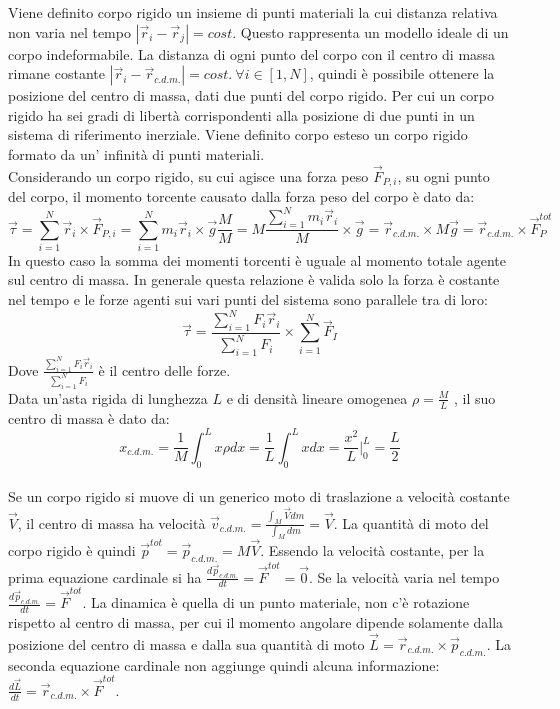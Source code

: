 \documentclass{article}
\numberwithin{equation}{subsection}
\begin{document}
Viene definito corpo rigido un insieme di punti materiali la 
cui distanza relativa non varia nel tempo $|\vec{r}_i-\vec{r}_j|=cost.$ Questo rappresenta un modello ideale di un corpo indeformabile. 
La distanza di ogni punto del corpo con il centro di massa 
rimane costante $|\vec{r}_i-\vec{r}_{c.d.m.}|=cost.\:\forall i\in[1,N]$, quindi è possibile ottenere la posizione 
del centro di massa, dati due punti del corpo rigido. Per cui un 
corpo rigido ha sei gradi di libertà corrispondenti alla posizione di due punti in un sistema di riferimento inerziale.  
Viene definito corpo esteso un corpo rigido formato da un'
infinità di punti materiali. 
\\
Considerando un corpo rigido, su cui agisce una forza peso $\vec{F}_{{P,i}}$, 
su ogni punto del corpo, il momento torcente causato dalla forza 
peso del corpo è dato da: 
\begin{equation*}
    \vec{\tau}=\displaystyle\sum_{i=1}^{N}\vec{r}_i\times\vec{F}_{P,i}=
    \displaystyle\sum_{i=1}^{N}m_i\vec{r}_i\times\vec{g}\frac{M}{M}=
    M\displaystyle\frac{\sum_{i=1}^{N}m_i\vec{r}_i}{M}\times\vec{g}=
    \vec{r}_{c.d.m.}\times M\vec{g}=
    \vec{r}_{c.d.m.}\times \vec{F}_P^{tot}
\end{equation*}
In questo caso la somma dei momenti torcenti è uguale al 
momento totale agente sul centro di massa. In generale questa 
relazione è valida solo la forza è costante nel tempo e le 
forze agenti sui vari punti del sistema sono parallele tra di loro: 
\begin{equation}
    \vec{\tau}=\displaystyle\frac{\sum_{i=1}^{N}F_i\vec{r}_i}{\sum_{i=1}^{N}F_i}\times\sum_{i=1}^{N}\vec{F}_I
\end{equation}
Dove $\displaystyle\frac{\sum_{i=1}^{N}F_i\vec{r}_i}{\sum_{i=1}^{N}F_i}$ 
è il centro delle forze.
\\
Data un'asta rigida di lunghezza $L$ e di densità lineare omogenea $\rho=\displaystyle\frac{M}{L}$ , 
il suo centro di massa è dato da:
\begin{equation*}
    x_{c.d.m.}=\displaystyle\frac{1}{M}\int_{0}^{L}x\rho dx=\frac{1}{L}\int_{0}^{L}xdx=\frac{x^2}{L}\Bigg|_0^L=\frac{L}{2} 
\end{equation*}
\\
Se un corpo rigido si muove di un generico moto di traslazione a velocità costante $\vec{V}$, 
il centro di massa ha velocità $\vec{v}_{c.d.m.}=\displaystyle\frac{\int_M\vec{V}dm}{\int_M dm}=\vec{V}$. La quantità di moto del corpo rigido è quindi 
$\vec{p}^{tot}=\vec{p}_{c.d.m.}=M\vec{V}$. Essendo la velocità costante, per la prima equazione cardinale si ha $\displaystyle\frac{d\vec{p}_{c.d.m.}}{dt}=\vec{F}^{tot}=\vec0$. 
Se la velocità varia nel tempo $\displaystyle\frac{d\vec{p}_{c.d.m.}}{dt}=\vec{F}^{tot}$. 
La dinamica è quella di un punto materiale, non c'è rotazione rispetto al centro di massa, per cui il 
momento angolare dipende solamente dalla posizione del centro di massa e dalla sua quantità di moto $\vec L=\vec{r}_{c.d.m.}\times\vec{p}_{c.d.m.}$. La seconda 
equazione cardinale non aggiunge quindi alcuna informazione: $\displaystyle\frac{d\vec{L}}{dt}=\vec{r}_{c.d.m.}\times\vec{F}^{tot}$. 
\end{document}
